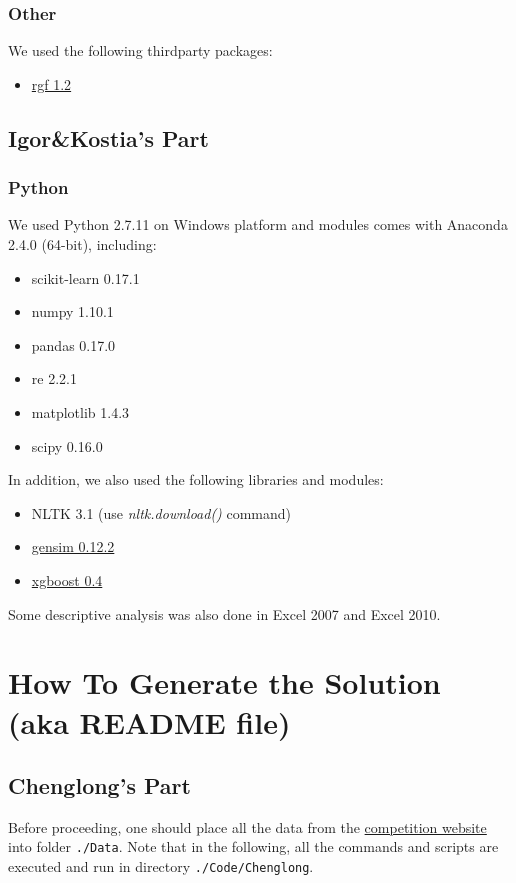 \documentclass[12pt]{article}
\begin{document}
{{\begin{appendices}
\subsubsection{Other}
We used the following thirdparty packages:
\begin{itemize}
\item \href{http://stat.rutgers.edu/home/tzhang/software/rgf/rgf1.2.zip}{rgf 1.2}
\end{itemize}



\subsection{Igor\&Kostia's Part}
\label{subsec:Dependencies_IandK}
\subsubsection{Python}
We used Python 2.7.11  on Windows platform and modules comes with Anaconda 2.4.0 (64-bit), including:
\begin{itemize}
\item scikit-learn 0.17.1
\item numpy 1.10.1
\item pandas 0.17.0
\item re 2.2.1
\item matplotlib 1.4.3
\item scipy 0.16.0
\end{itemize}

In addition, we also used the following libraries and modules:
\begin{itemize}
\item NLTK 3.1 (use \emph{nltk.download()} command)
\item \href{https://github.com/piskvorky/gensim/archive/0.12.2.tar.gz}{gensim 0.12.2}
\item \href{https://github.com/dmlc/xgboost/archive/v0.40.tar.gz}{xgboost 0.4}
\end{itemize}

Some descriptive analysis was also done in Excel 2007 and Excel 2010.




\section{How To Generate the Solution (aka README file)}
\subsection{Chenglong's Part}
Before proceeding, one should place all the data from the \href{https://www.kaggle.com/c/home-depot-product-search-relevance/dat}{competition website} into folder \texttt{./Data}. Note that in the following, all the commands and scripts are executed and run in directory \texttt{./Code/Chenglong}.


\end{appendices}}}
\end{document}

